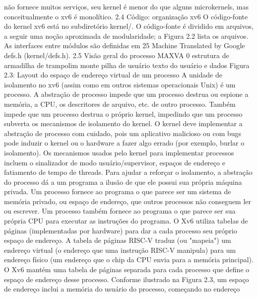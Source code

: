 não  fornece  muitos  serviços,  seu  kernel  é  menor  do  que  alguns
 microkernels,  mas  conceitualmente  o  xv6  é  monolítico.
 2.4  Código:  organização  xv6
 O  código-fonte  do  kernel  xv6  está  no  subdiretório  kernel/.  O  código-fonte  é  dividido  em  arquivos,  a  seguir
 uma  noção  aproximada  de  modularidade;  a  Figura  2.2  lista  os  arquivos.  As  interfaces  entre  módulos  são  definidas  em
 25
Machine Translated by Google
 defs.h  (kernel/defs.h).
 2.5  Visão  geral  do  processo
 MAXVA
 0
 estrutura  de  
armadilha  de  trampolim
 monte
 pilha  de  usuário
 texto  do  usuário
 e  dados
 Figura  2.3:  Layout  do  espaço  de  endereço  virtual  de  um  processo
 A  unidade  de  isolamento  no  xv6  (assim  como  em  outros  sistemas  operacionais  Unix)  é  um  processo.  A  abstração  de  
processo  impede  que  um  processo  destrua  ou  espione  a  memória,  a  CPU,  os  descritores  de  arquivo,  etc.  de  outro  processo.  
Também  impede  que  um  processo  destrua  o  próprio  kernel,  impedindo  que  um  processo  subverta  os  mecanismos  de  
isolamento  do  kernel.  O  kernel  deve  implementar  a  abstração  de  processo  com  cuidado,  pois  um  aplicativo  malicioso  ou  
com  bugs  pode  induzir  o  kernel  ou  o  hardware  a  fazer  algo  errado  (por  exemplo,  burlar  o  isolamento).  Os  mecanismos  
usados  pelo  kernel  para  implementar  processos  incluem  o  sinalizador  de  modo  usuário/supervisor,  espaços  de  endereço  e  
fatiamento  de  tempo  de  threads.
 Para  ajudar  a  reforçar  o  isolamento,  a  abstração  do  processo  dá  a  um  programa  a  ilusão  de  que  ele  possui  sua  própria  
máquina  privada.  Um  processo  fornece  ao  programa  o  que  parece  ser  um  sistema  de  memória  privado,  ou  espaço  de  
endereço,  que  outros  processos  não  conseguem  ler  ou  escrever.  Um  processo  também  fornece  ao  programa  o  que  parece  
ser  sua  própria  CPU  para  executar  as  instruções  do  programa.
 O  Xv6  utiliza  tabelas  de  páginas  (implementadas  por  hardware)  para  dar  a  cada  processo  seu  próprio  espaço  de  
endereço.  A  tabela  de  páginas  RISC-V  traduz  (ou  "mapeia")  um  endereço  virtual  (o  endereço  que  uma  instrução  RISC-V  
manipula)  para  um  endereço  físico  (um  endereço  que  o  chip  da  CPU  envia  para  a  memória  principal).
 O  Xv6  mantém  uma  tabela  de  páginas  separada  para  cada  processo  que  define  o  espaço  de  endereço  desse  processo.
 Conforme  ilustrado  na  Figura  2.3,  um  espaço  de  endereço  inclui  a  memória  do  usuário  do  processo,  começando  no  endereço  
